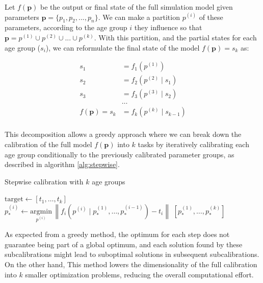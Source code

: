 \documentclass{IOS-Book-Article}
\newcommand\norm[1]{\left\lVert#1\right\rVert}
\begin{document}
 	Let $f(\bm{p})$ be the output or final state of the full simulation model given parameters $\bm{p} = \{p_1, p_2, ..., p_n\}$. We can make a partition $p^{(i)}$ of these parameters, according to the age group $i$ they influence so that $\bm{p} = p^{(1)} \cup p^{(2)} \cup ... \cup p^{(k)}$. With this partition, and the partial states for each age group ($s_i$), we can reformulate the final state of the model $f(\bm{p}) = s_k$ as:
 	
 	\begin{equation} \label{eq:stepwise-function}
 		\begin{aligned}
 			s_1 &= f_1(p^{(1)}) \\
 			s_2 &= f_2(p^{(2)} \mid s_1) \\
 			s_3 &= f_3(p^{(3)} \mid s_2) \\
 			&\dots \\
 			f(\bm{p}) = s_k &= f_k(p^{(k)} \mid s_{k-1}) \\ %
 		\end{aligned}
 	\end{equation}	
 	
 	This decomposition allows a greedy approach where we can break down the calibration of the full model $f(\bm{p})$ into $k$ tasks by iteratively calibrating each age group conditionally to the previously calibrated parameter groups, as described in algorithm \ref{alg:stepwise}.
 	
 	\begin{algorithm}[h!]
 		\caption{Stepwise calibration with $k$ age groups}\label{alg:stepwise}
 		\begin{algorithmic}
 			\State $\mathrm{target} \gets [t_1, \dots, t_k]$
 			 \\
 			\State $p_*^{(i)} \gets \underset{p^{(i)}}{\mathrm{argmin}}\, \norm{f_i\left(p^{(i)} \mid p_*^{(1)}, \dots, p_*^{(i-1)}\right) -  t_i}$
 			\EndFor
 			\State \Return $[p_*^{(1)}, \dots, p_*^{(k)}]$
 		\end{algorithmic}
 	\end{algorithm}
 	
 	As expected from a greedy method, the optimum for each step does not guarantee being part of a global optimum, and each solution found by these subcalibrations might lead to suboptimal solutions in subsequent subcalibrations. On the other hand, This method lowers the dimensionality of the full calibration into $k$ smaller optimization problems, reducing the overall computational effort.
 	
\end{document}
